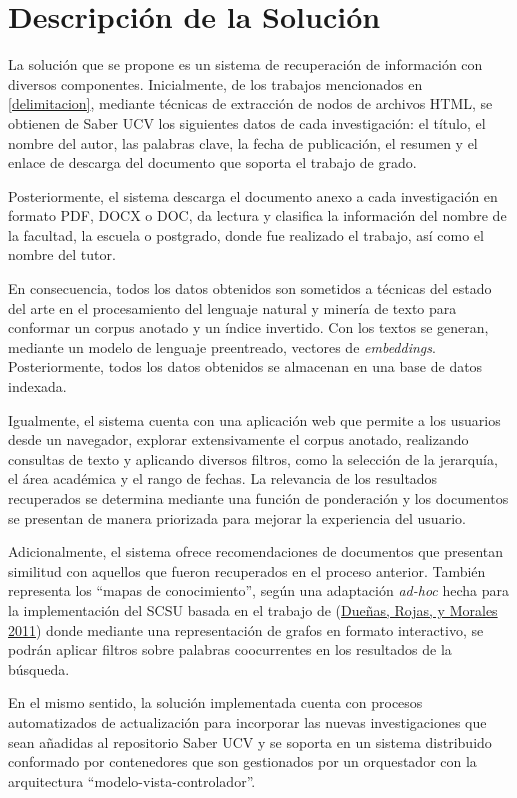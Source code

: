 \documentclass[
  12pt,
  openany]{book}
\begin{document}
\hypertarget{descripcion}{%
\section{Descripción de la Solución}\label{descripcion}}

La solución que se propone es un sistema de recuperación de información con diversos componentes. Inicialmente, de los trabajos mencionados en \ref{delimitacion}, mediante técnicas de extracción de nodos de archivos HTML, se obtienen de Saber UCV los siguientes datos de cada investigación: el título, el nombre del autor, las palabras clave, la fecha de publicación, el resumen y el enlace de descarga del documento que soporta el trabajo de grado.

Posteriormente, el sistema descarga el documento anexo a cada investigación en formato PDF, DOCX o DOC, da lectura y clasifica la información del nombre de la facultad, la escuela o postgrado, donde fue realizado el trabajo, así como el nombre del tutor.

En consecuencia, todos los datos obtenidos son sometidos a técnicas del estado del arte en el procesamiento del lenguaje natural y minería de texto para conformar un corpus anotado y un índice invertido. Con los textos se generan, mediante un modelo de lenguaje preentreado, vectores de \emph{embeddings}. Posteriormente, todos los datos obtenidos se almacenan en una base de datos indexada.

Igualmente, el sistema cuenta con una aplicación web que permite a los usuarios desde un navegador, explorar extensivamente el corpus anotado, realizando consultas de texto y aplicando diversos filtros, como la selección de la jerarquía, el área académica y el rango de fechas. La relevancia de los resultados recuperados se determina mediante una función de ponderación y los documentos se presentan de manera priorizada para mejorar la experiencia del usuario.

Adicionalmente, el sistema ofrece recomendaciones de documentos que presentan similitud con aquellos que fueron recuperados en el proceso anterior. También representa los ``mapas de conocimiento'', según una adaptación \emph{ad-hoc} hecha para la implementación del SCSU basada en el trabajo de (\protect\hyperlink{ref-dueuxf1as2011}{Dueñas, Rojas, y Morales 2011}) donde mediante una representación de grafos en formato interactivo, se podrán aplicar filtros sobre palabras coocurrentes en los resultados de la búsqueda.

En el mismo sentido, la solución implementada cuenta con procesos automatizados de actualización para incorporar las nuevas investigaciones que sean añadidas al repositorio Saber UCV y se soporta en un sistema distribuido conformado por contenedores que son gestionados por un orquestador con la arquitectura ``modelo-vista-controlador''.
\end{document}
